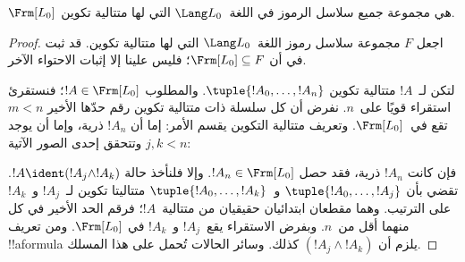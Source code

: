 \documentclass[../../../include/open-logic-section]{subfiles}
\begin{document}
\begin{thm}
$\Frm[L_0]$ هي مجموعة جميع سلاسل الرموز في اللغة~$\Lang L_0$ التي
لها متتالية تكوين.
\end{thm}

\begin{proof}
اجعل $F$ مجموعة سلاسل رموز اللغة~$\Lang L_0$ التي لها متتالية تكوين.
قد ثبت في  أن
$\Frm[L_0] \subseteq F$؛ فليس علينا إلا إثبات الاحتواء الآخر.

لتكن لـ~$!A$ متتالية تكوين $\tuple{!A_0,\dotsc,!A_n}$.
والمطلوب $!A \in \Frm[L_0]$؛ فنستقرئ استقراء قويًا على~$n$.
نفرض أن كل سلسلة ذات متتالية تكوين رقم حدّها الأخير
$m < n$ تقع في~$\Frm[L_0]$. وتعريف متتالية التكوين يقسم الأمر: إما أن $!A_n$ ذرية، وإما أن يوجد $j,k < n$ وتتحقق إحدى الصور الآتية:
\begin{enumerate}
\end{enumerate}
فإن كانت $!A_n$ ذرية، فقد حصل
$!A_n \in \Frm[L_0]$. وإلا فلنأخذ حالة $!A \ident
(!A_j \land !A_k)$. تقضي  بأن
$\tuple{!A_0,\dotsc,!A_j}$ و~$\tuple{!A_0,\dotsc,!A_k}$ متتاليتا تكوين لـ~$!A_j$ و~$!A_k$ على الترتيب. وهما مقطعان ابتدائيان حقيقيان من متتالية~$!A$؛ فرقم الحد الأخير في كل منهما أقل من~$n$. وبفرض الاستقراء يقع~$!A_j$ و~$!A_k$ في
$\Frm[L_0]$. ومن تعريف !!a{formula} يلزم أن
$(!A_j \land !A_k)$ كذلك. وسائر الحالات تُحمل على هذا المسلك.
\end{proof}
\end{document}
